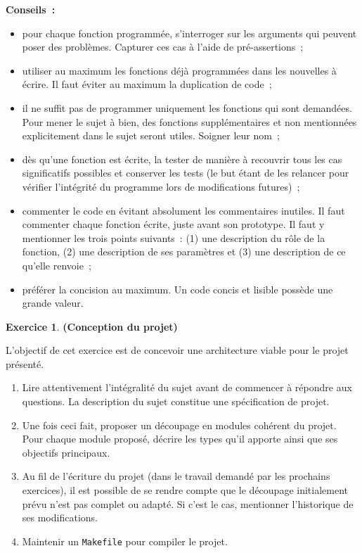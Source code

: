 \documentclass[12pt]{article}
\theoremstyle{definition}
\newtheorem{Exercice}{Exercice}
\begin{document}
{\bf Conseils~:}
\begin{itemize}
    \item pour chaque fonction programmée, s'interroger sur les arguments
    qui peuvent poser des problèmes. Capturer ces cas à l'aide de
    pré-assertions~;
    \item utiliser au maximum les fonctions déjà programmées dans les
    nouvelles à écrire. Il faut éviter au maximum la duplication de code~;
    \item il ne suffit pas de programmer uniquement les fonctions qui sont
    demandées. Pour mener le sujet à bien, des fonctions supplémentaires
    et non mentionnées explicitement dans le sujet seront utiles. Soigner
    leur nom~;
    \item dès qu'une fonction est écrite, la tester de manière à
    recouvrir tous les cas significatifs possibles et conserver les tests
    (le but étant de les relancer pour vérifier l'intégrité du
    programme lors de modifications futures)~;
    \item commenter le code en évitant absolument les commentaires inutiles.
    Il faut commenter chaque fonction écrite, juste avant son prototype.
    Il faut y mentionner les trois points suivants~: (1) une description
    du rôle de la fonction, (2) une description de ses paramètres et (3)
    une description de ce qu'elle renvoie~;
    \item préférer la concision au maximum. Un code concis et lisible
    possède une grande valeur.
\end{itemize}
\bigskip
\bigskip

\begin{Exercice} {\bf (Conception du projet)}\smallskip

L'objectif de cet exercice est de concevoir une architecture viable pour
le projet présenté.
\begin{enumerate}
    \item Lire attentivement l'intégralité du sujet avant de commencer
    à répondre aux questions. La description du sujet constitue une 
    spécification de projet. 
    \smallskip
    
    \item Une fois ceci fait, proposer un découpage en modules cohérent 
    du projet. Pour chaque module proposé, décrire les types qu'il apporte 
    ainsi que ses objectifs principaux.
    \smallskip
    
    \item Au fil de l'écriture du projet (dans le travail demandé par les 
    prochains exercices), il est possible de se rendre compte que le 
    découpage initialement prévu n'est pas complet ou adapté. Si c'est 
    le cas, mentionner l'historique de ses modifications.
    \smallskip
    
    \item Maintenir un {\tt Makefile} pour compiler le projet.
\end{enumerate}
\end{Exercice}
\bigskip
\end{document}
